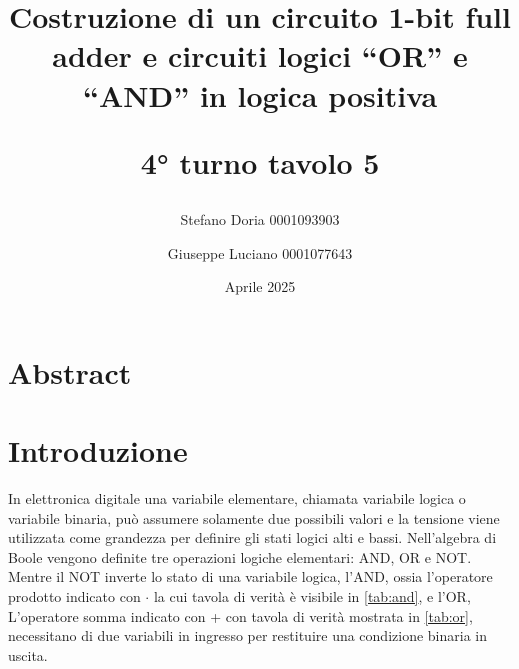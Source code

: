 \documentclass[a4paper,11pt]{article}
\begin{document}
	\title{\textbf{Costruzione di un circuito 1-bit full adder e circuiti logici “OR” e “AND” in logica positiva}
		
		4° turno tavolo 5}
	\author{Stefano Doria 0001093903 \and Giuseppe Luciano 0001077643}
	
	\date{Aprile 2025}
	
	\maketitle
	
	\section{Abstract}
	
	
	\section{Introduzione}
	In elettronica digitale una variabile elementare, chiamata variabile logica o variabile binaria, può assumere solamente due possibili valori e la tensione viene utilizzata come grandezza per definire gli stati logici alti e bassi. Nell'algebra di Boole vengono definite tre operazioni logiche elementari: AND, OR e NOT. Mentre il NOT inverte lo stato di una variabile logica, l'AND, ossia l'operatore prodotto indicato con $\cdot$ la cui tavola di verità è visibile in \ref{tab:and}, e l'OR, L'operatore somma indicato con + con tavola di verità mostrata in \ref{tab:or}, necessitano di due variabili in ingresso per restituire una condizione binaria in uscita.
	
\end{document}
